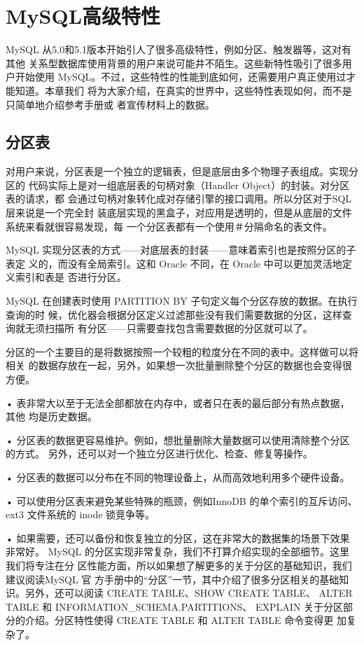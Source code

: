\chapter{MySQL高级特性}
MySQL 从5.0和5.1版本开始引人了很多高级特性，例如分区、触发器等，这对有其他
关系型数据库使用背景的用户来说可能井不陌生。这些新特性吸引了很多用户开始使用
MySQL。不过，这些特性的性能到底如何，还需要用户真正使用过才能知道。本章我们
将为大家介绍，在真实的世界中，这些特性表现如何，而不是只简单地介绍参考手册或
者宣传材料上的数据。

\section{分区表}
对用户来说，分区表是一个独立的逻辑表，但是底层由多个物理子表组成。实现分区的
代码实际上是对一组底层表的句柄对象（Handler Object）的封装。对分区表的请求，都
会通过句柄对象转化成对存储引擎的接口调用。所以分区对于SQL 层来说是一个完全封
装底层实现的黑盒子，对应用是透明的，但是从底层的文件系统来看就很容易发现，每
一个分区表都有一个使用＃分隔命名的表文件。

MySQL 实现分区表的方式——对底层表的封装——意味着索引也是按照分区的子表定
义的，而没有全局索引。这和 Oracle 不同，在 Oracle 中可以更加灵活地定义索引和表是
否进行分区。

MySQL 在创建表时使用 PARTITION BY 子句定义每个分区存放的数据。在执行查询的时
候，优化器会根据分区定义过滤那些没有我们需要数据的分区，这样查询就无须扫描所
有分区——只需要查找包含需要数据的分区就可以了。

分区的一个主要目的是将数据按照一个较粗的粒度分在不同的表中。这样做可以将相关
的数据存放在一起，另外，如果想一次批量删除整个分区的数据也会变得很方便。

• 表非常大以至于无法全部都放在内存中，或者只在表的最后部分有热点数据，其他
均是历史数据。

• 分区表的数据更容易维护。例如，想批量删除大量数据可以使用清除整个分区的方式。
另外，还可以对一个独立分区进行优化、检查、修复等操作。

• 分区表的数据可以分布在不同的物理设备上，从而高效地利用多个硬件设备。

• 可以使用分区表来避免某些特殊的瓶颈，例如InnoDB 的单个索引的互斥访问、ext3
文件系统的 inode 锁竞争等。

• 如果需要，还可以备份和恢复独立的分区，这在非常大的数据集的场景下效果非常好。
MySQL 的分区实现非常复杂，我们不打算介绍实现的全部细节。这里我们将专注在分
区性能方面，所以如果想了解更多的关于分区的基础知识，我们建议阅读MySQL 官
方手册中的“分区”一节，其中介绍了很多分区相关的基础知识。另外，还可以阅读
CREATE TABLE、SHOW CREATE TABLE、 ALTER TABLE 和 INFORMATION\_SCHEMA.PARTITIONS、
EXPLAIN 关于分区部分的介绍。分区特性使得 CREATE TABLE 和 ALTER TABLE 命令变得更
加复杂了。

